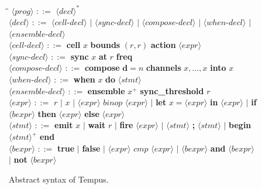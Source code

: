 \documentclass[twocolumn,10pt]{article}
\begin{document}
\begin{figure}[ht]
\small
\begin{tabbing}
\hspace{1em}\=\hspace{0.5em}\=\kill
$\langle\mathit{prog}\rangle$  \> $::=$ \> $\langle\mathit{decl}\rangle^*$  \\[2pt]
$\langle\mathit{decl}\rangle$  \> $::=$ \>
  $\langle\mathit{cell\text{-}decl}\rangle$
  $\mid$ $\langle\mathit{sync\text{-}decl}\rangle$
  $\mid$ $\langle\mathit{compose\text{-}decl}\rangle$
  $\mid$ $\langle\mathit{when\text{-}decl}\rangle$
  $\mid$ $\langle\mathit{ensemble\text{-}decl}\rangle$\\[2pt]
$\langle\mathit{cell\text{-}decl}\rangle$ \> $::=$ \>
  \textbf{cell} $x$
  \textbf{bounds} $(r, r)$
  \textbf{action} $\langle\mathit{expr}\rangle$ \\[2pt]
$\langle\mathit{sync\text{-}decl}\rangle$ \> $::=$ \>
  \textbf{sync} $x$
  \textbf{at} $r$ \textbf{freq} \\[2pt]
$\langle\mathit{compose\text{-}decl}\rangle$ \> $::=$ \>
  \textbf{compose} $\mathbf{d}{=}n$
  \textbf{channels} $x, \ldots, x$
  \textbf{into} $x$ \\[2pt]
$\langle\mathit{when\text{-}decl}\rangle$ \> $::=$ \>
  \textbf{when} $x$ \textbf{do} $\langle\mathit{stmt}\rangle$ \\[2pt]
$\langle\mathit{ensemble\text{-}decl}\rangle$ \> $::=$ \>
  \textbf{ensemble} $x^+$
  \textbf{sync\_threshold} $r$ \\[2pt]
$\langle\mathit{expr}\rangle$ \> $::=$ \>
  $r$ $\mid$ $x$
  $\mid$ $\langle\mathit{expr}\rangle$ $\mathit{binop}$
  $\langle\mathit{expr}\rangle$
  $\mid$ \textbf{let} $x = \langle\mathit{expr}\rangle$
  \textbf{in} $\langle\mathit{expr}\rangle$
  $\mid$ \textbf{if} $\langle\mathit{bexpr}\rangle$
  \textbf{then} $\langle\mathit{expr}\rangle$
  \textbf{else} $\langle\mathit{expr}\rangle$ \\[2pt]
$\langle\mathit{stmt}\rangle$ \> $::=$ \>
  \textbf{emit} $x$
  $\mid$ \textbf{wait} $r$
  $\mid$ \textbf{fire} $\langle\mathit{expr}\rangle$
  $\mid$ $\langle\mathit{stmt}\rangle$ \textbf{;} $\langle\mathit{stmt}\rangle$
  $\mid$ \textbf{begin} $\langle\mathit{stmt}\rangle^+$ \textbf{end} \\[2pt]
$\langle\mathit{bexpr}\rangle$ \> $::=$ \>
  \textbf{true} $\mid$ \textbf{false}
  $\mid$ $\langle\mathit{expr}\rangle$ $\mathit{cmp}$
  $\langle\mathit{expr}\rangle$
  $\mid$ $\langle\mathit{bexpr}\rangle$ \textbf{and}
  $\langle\mathit{bexpr}\rangle$
  $\mid$ \textbf{not} $\langle\mathit{bexpr}\rangle$
\end{tabbing}
\caption{Abstract syntax of Tempus.}
\label{fig:bnf}
\end{figure}
\end{document}
